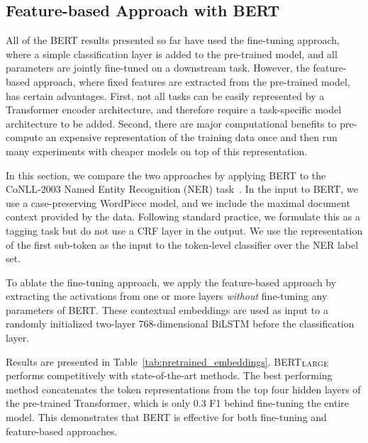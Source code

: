 \documentclass[11pt,a4paper]{article}
\newcommand\bertlarge{BERT$_{\small \textsc{LARGE}}$\xspace}
\begin{document}
\subsection{Feature-based Approach with BERT}
\label{sec:ner}
All of the BERT results presented so far have used the fine-tuning approach, where a simple classification layer is added to the pre-trained model, and all parameters are jointly fine-tuned on a downstream task. However, the feature-based approach, where fixed features are extracted from the pre-trained model, has certain advantages. First, not all
tasks can be easily represented by a Transformer encoder architecture, and therefore require a task-specific model architecture to be added. Second, there are major computational benefits to
pre-compute an expensive representation of the training data once and then run many experiments with 
cheaper
models on top of this representation. 

In this section, we compare the two approaches by applying BERT to the CoNLL-2003 Named Entity Recognition (NER) task~\cite{tjong-de:2003}. In the input to BERT, we use a case-preserving WordPiece model, and we include the maximal document context provided by the data. Following standard practice, we formulate this as a tagging task but do not use a CRF layer in the output. We use the representation of the first sub-token as the input to the token-level classifier over the NER label set.

To ablate the fine-tuning approach, we apply the feature-based approach by extracting the activations from one or more layers {\it without} fine-tuning any parameters of BERT. These contextual embeddings are used as input to a randomly initialized two-layer 768-dimensional BiLSTM before the classification layer.

Results are presented in Table~\ref{tab:pretrained_embeddings}. \bertlarge performs competitively with state-of-the-art methods. The best performing method concatenates the token representations from the top four hidden layers of the pre-trained Transformer, which is only 0.3 F1 behind fine-tuning the entire model. This demonstrates that BERT is effective for both fine-tuning and feature-based approaches.
\end{document}
